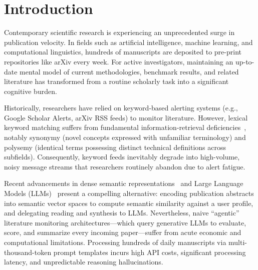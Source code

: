 \section{Introduction}
\label{sec:intro}

Contemporary scientific research is experiencing an unprecedented surge in publication velocity. In fields such as artificial intelligence, machine learning, and computational linguistics, hundreds of manuscripts are deposited to pre-print repositories like arXiv every week. For active investigators, maintaining an up-to-date mental model of current methodologies, benchmark results, and related literature has transformed from a routine scholarly task into a significant cognitive burden.

Historically, researchers have relied on keyword-based alerting systems (e.g., Google Scholar Alerts, arXiv RSS feeds) to monitor literature. However, lexical keyword matching suffers from fundamental information-retrieval deficiencies~\cite{manning2008introduction,robertson1976relevance}, notably synonymy (novel concepts expressed with unfamiliar terminology) and polysemy (identical terms possessing distinct technical definitions across subfields). Consequently, keyword feeds inevitably degrade into high-volume, noisy message streams that researchers routinely abandon due to alert fatigue.

Recent advancements in dense semantic representations~\cite{reimers2019sentencebert,beltagy2019scibert,cohan2020specter} and Large Language Models (LLMs)~\cite{vaswani2017attention} present a compelling alternative: encoding publication abstracts into semantic vector spaces to compute semantic similarity against a user profile, and delegating reading and synthesis to LLMs. Nevertheless, naive ``agentic'' literature monitoring architectures---which query generative LLMs to evaluate, score, and summarize every incoming paper---suffer from acute economic and computational limitations. Processing hundreds of daily manuscripts via multi-thousand-token prompt templates incurs high API costs, significant processing latency, and unpredictable reasoning hallucinations.

